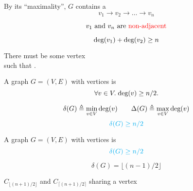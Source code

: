 \begin{frame}{}
  \begin{center}
    By its ``maximality'', $G$ contains a  \\[3pt]
    \[
      v_{1} \to v_{2} \to \dots \to v_{n}
    \]

    \pause
    \vspace{-0.60cm}
    \[
      v_{1} \text{ and } v_{n} \text{ are \textcolor{red}{non-adjacent}}
    \]

    \pause
    \vspace{-0.60cm}
    \[
      \text{deg}(v_{1}) + \text{deg}(v_{2}) \ge n
    \]

    \pause
    There must be some vertex  \\[3pt]
    such that .
  \end{center}
\end{frame}

\begin{frame}{}
  \begin{theorem}
    A  graph $G = (V, E)$
    with  vertices is 
    \[
      \forall v \in V.\; \text{deg}(v) \ge n/2.
    \]
  \end{theorem}

  \pause
  \[
    \delta(G) \triangleq \min_{v \in V} \text{deg}(v)
    \qquad
    \Delta(G) \triangleq \max_{v \in V} \text{deg}(v)
  \]
  \[
    \textcolor{cyan}{\delta(G) \ge n/2}
  \]

  \pause
\end{frame}

\begin{frame}{}
  \begin{theorem}
    A  graph $G = (V, E)$
    with  vertices is 
    \[
      \textcolor{cyan}{\delta(G) \ge n/2}
    \]
  \end{theorem}

  \pause
  \[
    \delta(G) = \lfloor (n-1)/2 \rfloor
  \]

  \pause
  \vspace{0.30cm}
  \begin{center}
    $C_{\lfloor (n + 1)/ 2 \rfloor}$ and $C_{\lceil (n+1)/2 \rceil}$
    sharing a vertex
  \end{center}
\end{frame}
